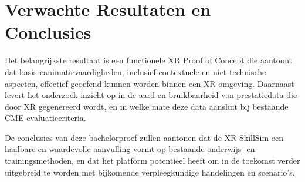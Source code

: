 \section{Verwachte Resultaten en Conclusies}%
\label{sec:verwachte_resultaten_en_conclusies}

Het belangrijkste resultaat is een functionele XR Proof of Concept die aantoont dat basisreanimatievaardigheden, inclusief contextuele en niet-technische aspecten, effectief geoefend kunnen worden binnen een XR-omgeving. Daarnaast levert het onderzoek inzicht op in de aard en bruikbaarheid van prestatiedata die door XR gegenereerd wordt, en in welke mate deze data aansluit bij bestaande CME-evaluatiecriteria.

De conclusies van deze bachelorproef zullen aantonen dat de XR SkillSim een haalbare en waardevolle aanvulling vormt op bestaande onderwijs- en trainingsmethoden, en dat het platform potentieel heeft om in de toekomst verder uitgebreid te worden met bijkomende verpleegkundige handelingen en scenario’s.

